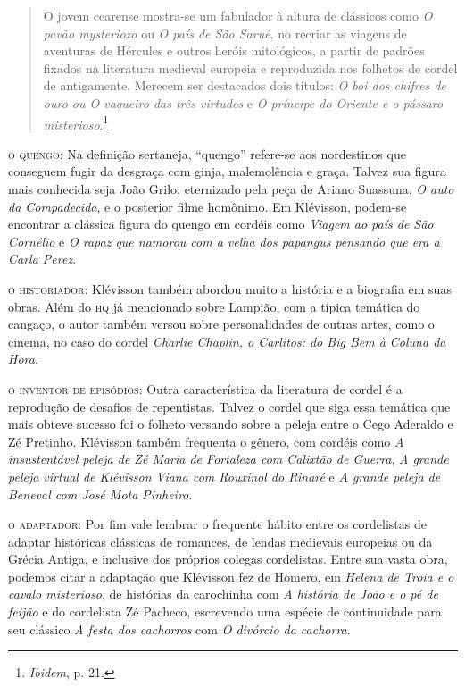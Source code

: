 \documentclass[11pt]{extarticle}
\begin{document}
\begin{quote}
O jovem cearense mostra-se um fabulador à altura de clássicos como \textit{O pavão mysteriozo} ou \textit{O país de São Saruê}, no recriar as viagens de aventuras de Hércules e outros heróis mitológicos, a partir de padrões fixados na literatura medieval europeia e reproduzida nos folhetos de cordel de antigamente. Merecem ser destacados dois títulos: \textit{O boi dos chifres de ouro ou O vaqueiro das três virtudes} e \textit{O príncipe do Oriente e o pássaro misterioso}.\footnote{\textit{Ibidem}, p. 21.}
\end{quote}

\noindent\textsc{o quengo}: Na definição sertaneja, ``quengo'' refere-se aos nordestinos que conseguem fugir da desgraça com ginja, malemolência e graça. Talvez sua figura mais conhecida seja João Grilo, eternizado pela peça de Ariano Suassuna, \textit{O auto da Compadecida}, e o posterior filme homônimo. Em Klévisson, podem-se encontrar a clássica figura do quengo em cordéis como \textit{Viagem ao país de São Cornélio} e \textit{O rapaz que namorou com a velha dos papangus pensando que era a Carla Perez}. 


\noindent\textsc{o historiador}: Klévisson também abordou muito a história e a biografia em suas obras. Além do \textsc{hq} já mencionado sobre Lampião, com a típica temática do cangaço, o autor também versou sobre personalidades de outras artes, como o cinema, no caso do cordel \textit{Charlie Chaplin, o Carlitos: do Big Bem à Coluna da Hora}.

\noindent\textsc{o inventor de episódios}: Outra característica da literatura de cordel é a reprodução de desafios de repentistas. Talvez o cordel que siga essa temática que mais obteve sucesso foi o folheto versando sobre a peleja entre o Cego Aderaldo e Zé Pretinho. Klévisson também frequenta o gênero, com cordéis como \textit{A insustentável
peleja de Zé Maria de Fortaleza com Calixtão de Guerra}, \textit{A grande peleja virtual de Klévisson Viana com Rouxinol do Rinaré} e \textit{A grande peleja de Beneval com José Mota Pinheiro}.

\noindent\textsc{o adaptador}: Por fim vale lembrar o frequente hábito entre os cordelistas de adaptar históricas clássicas de romances, de lendas medievais europeias ou da Grécia Antiga, e inclusive dos próprios colegas cordelistas. Entre sua vasta obra, podemos citar a adaptação que Klévisson fez de Homero, em \textit{Helena de Troia e o cavalo misterioso}, de histórias da carochinha com \textit{A história de João e o pé de feijão} e do cordelista Zé Pacheco, escrevendo uma espécie de continuidade para seu clássico \textit{A festa dos cachorros} com \textit{O divórcio da cachorra}.
\end{document}
